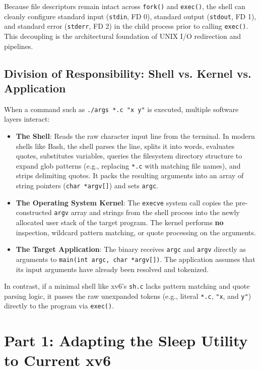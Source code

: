 \documentclass[12pt,a4paper]{article}
\begin{document}
Because file descriptors remain intact across \texttt{fork()} and \texttt{exec()}, the shell can cleanly configure standard input (\texttt{stdin}, FD 0), standard output (\texttt{stdout}, FD 1), and standard error (\texttt{stderr}, FD 2) in the child process prior to calling \texttt{exec()}. This decoupling is the architectural foundation of UNIX I/O redirection and pipelines.

\subsection{Division of Responsibility: Shell vs. Kernel vs. Application}
When a command such as \texttt{./args *.c "x y"} is executed, multiple software layers interact:
\begin{itemize}
    \item \textbf{The Shell}: Reads the raw character input line from the terminal. In modern shells like Bash, the shell parses the line, splits it into words, evaluates quotes, substitutes variables, queries the filesystem directory structure to expand glob patterns (e.g., replacing \texttt{*.c} with matching file names), and strips delimiting quotes. It packs the resulting arguments into an array of string pointers (\texttt{char *argv[]}) and sets \texttt{argc}.
    \item \textbf{The Operating System Kernel}: The \texttt{execve} system call copies the pre-constructed \texttt{argv} array and strings from the shell process into the newly allocated user stack of the target program. The kernel performs \textbf{no} inspection, wildcard pattern matching, or quote processing on the arguments.
    \item \textbf{The Target Application}: The binary receives \texttt{argc} and \texttt{argv} directly as arguments to \texttt{main(int argc, char *argv[])}. The application assumes that its input arguments have already been resolved and tokenized.
\end{itemize}

In contrast, if a minimal shell like xv6's \texttt{sh.c} lacks pattern matching and quote parsing logic, it passes the raw unexpanded tokens (e.g., literal \texttt{*.c}, \texttt{"x}, and \texttt{y"}) directly to the program via \texttt{exec()}.

\section{Part 1: Adapting the Sleep Utility to Current xv6}
\end{document}
